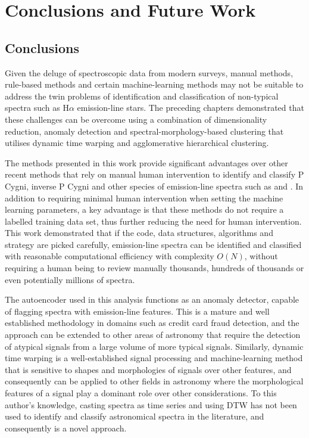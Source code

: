 \chapter{Conclusions and Future Work}

\section{Conclusions}

Given the deluge of spectroscopic data from modern surveys, manual methods, rule-based methods and certain machine-learning methods may not be suitable to address the twin problems of identification and classification of non-typical spectra such as H$\alpha$ emission-line stars. The preceding chapters demonstrated that these challenges can be overcome using a combination of dimensionality reduction, anomaly detection and spectral-morphology-based clustering that utilises dynamic time warping and agglomerative hierarchical clustering. 

The methods presented in this work provide significant advantages over other recent methods that rely on manual human intervention to identify and classify P Cygni, inverse P Cygni and other species of emission-line spectra such as \citet{zhang2021catalog} and \citet{zhao2012lamost}. In addition to requiring minimal human intervention when setting the machine learning parameters, a key advantage is that these methods do not require a labelled training data set, thus further reducing the need for human intervention.  This work demonstrated that if the code, data structures, algorithms and strategy are picked carefully, emission-line spectra can be identified and classified with reasonable computational efficiency with complexity $O(N)$, without requiring a human being to review manually thousands, hundreds of thousands  or even potentially millions of spectra.

The autoencoder used in this analysis functions as an anomaly detector, capable of flagging spectra with emission-line features. This is a mature and well established methodology in domains such as credit card fraud detection, and the approach can be extended to other areas of astronomy that require the detection of atypical signals from a large volume of more typical signals. Similarly, dynamic time warping is a well-established signal processing and machine-learning method that is sensitive to shapes and morphologies of signals over other features, and consequently can be applied to other fields in astronomy where the morphological features of a signal play a dominant role over other considerations. To this author's knowledge, casting spectra as time series and using DTW has not been used to identify and classify astronomical spectra in the literature, and consequently is a novel approach. 

